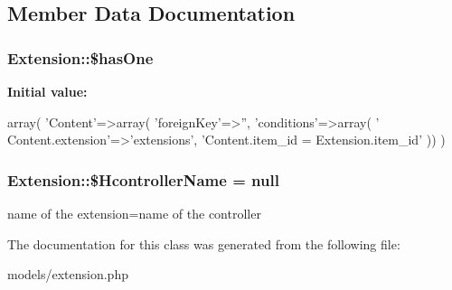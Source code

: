 \subsection{\-Member \-Data \-Documentation}
\hypertarget{class_extension_af1c4d0218b152e197099717ddb5fba7b}{
\subsubsection[{\$has\-One}]{\setlength{\rightskip}{0pt plus 5cm}\-Extension\-::\$has\-One}}
\label{class_extension_af1c4d0218b152e197099717ddb5fba7b}
{\bfseries \-Initial value\-:}
\begin{DoxyCode}
 array(
                       'Content'=>array(
                                          'foreignKey'=>'',
                                          'conditions'=>array(
                                                              '
      Content.extension'=>'extensions',
                                                              'Content.item_id
       = Extension.item_id'
                                                              ))
                        )
\end{DoxyCode}
\hypertarget{class_extension_adfc9e9443f5548da5fb81846472bfe92}{
\subsubsection[{\$\-Hcontroller\-Name}]{\setlength{\rightskip}{0pt plus 5cm}\-Extension\-::\$\-Hcontroller\-Name = null}}
\label{class_extension_adfc9e9443f5548da5fb81846472bfe92}
name of the extension=name of the controller 

\-The documentation for this class was generated from the following file\-:\begin{DoxyCompactItemize}
\item 
models/extension.\-php\end{DoxyCompactItemize}
